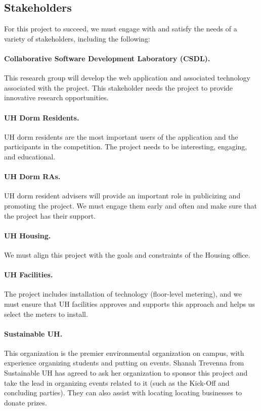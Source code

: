 \documentclass[11pt]{article}
\begin{document}
\subsection{Stakeholders}

For this project to succeed, we must engage with and satisfy the needs of a variety of stakeholders, including the following:

\paragraph{Collaborative Software Development Laboratory (CSDL).}   This research group will develop the web application and
associated technology associated with the project.  This stakeholder needs the project to provide innovative research opportunities. 

\paragraph{UH Dorm Residents.}  UH dorm residents are the most important
users of the application and the participants in the competition.  The
project needs to be interesting, engaging, and educational.

\paragraph{UH Dorm RAs.}  UH dorm resident advisers will provide an
important role in publicizing and promoting the project. We must engage
them early and often and make sure that the project  has their support. 

\paragraph{UH Housing.}  We must align this project with the goals and constraints of the Housing office. 

\paragraph{UH Facilities.}  The project includes installation of technology
(floor-level metering), and we must ensure that UH facilities approves and
supports this approach and helps us select the meters to install.

\paragraph{Sustainable UH.}  This organization is the premier environmental
organization on campus, with experience organizing students and putting on
events.  Shanah Trevenna from Sustainable UH has agreed to ask her
organization to sponsor this project and take the lead in organizing events
related to it (such as the Kick-Off and concluding parties).  They can also
assist with locating locating businesses to donate prizes.
\end{document}
